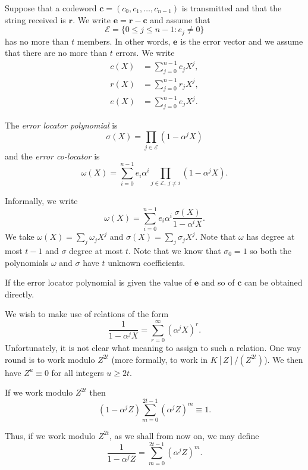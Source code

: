 Suppose that a codeword
${\mathbf c}=(c_{0},c_{1},\dots,c_{n-1})$ is
transmitted and that the string received is
${\mathbf r}$. We write
${\mathbf e}={\mathbf r}-{\mathbf c}$
and assume that
\[{\mathcal E}=\{0\leq j\leq n-1:e_{j}\neq 0\}\]
has no more than $t$ members.
In other words, ${\mathbf e}$ is the error vector
and we assume that there are no more than
$t$ errors.
We write
\begin{align*}
c(X)&=\sum_{j=0}^{n-1}c_{j}X^{j},\\
r(X)&=\sum_{j=0}^{n-1}r_{j}X^{j},\\
e(X)&=\sum_{j=0}^{n-1}e_{j}X^{j}.
\end{align*}


\begin{definition} The \emph{error locator polynomial} is
\[\sigma(X)=\prod_{j\in{\mathcal E}}(1-\alpha^{j}X)\]
and the \emph{error co-locator} is
\[\omega(X)=\sum_{i=0}^{n-1}e_{i}\alpha^{i}
\prod_{j\in{\mathcal E},\ j\neq i}(1-\alpha^{j}X).\]
\end{definition}
\noindent
Informally, we write
\[\omega(X)=\sum_{i=0}^{n-1}e_{i}\alpha^{i}
\frac{\sigma(X)}{1-\alpha^{i}X}.\]
We take $\omega(X)=\sum_{j}\omega_{j}X^{j}$ and
$\sigma(X)=\sum_{j}\sigma_{j}X^{j}$. Note that
$\omega$ has degree at most $t-1$ and $\sigma$
degree at most $t$. Note that we know that
$\sigma_{0}=1$ so both the polynomials
$\omega$ and $\sigma$ have $t$ unknown coefficients.
\begin{lemma} If the error locator polynomial
is given the value of ${\mathbf e}$ and so of ${\mathbf c}$
can be obtained directly.
\end{lemma}


We wish to make use of relations of the form
\[\frac{1}{1-\alpha^{j}X}=\sum_{r=0}^{\infty}(\alpha^{j}X)^{r}.\]
Unfortunately, it is not clear what meaning to assign
to such a relation. One way round is to work modulo $Z^{2t}$
(more formally, to work in $K[Z]/(Z^{2t})$). We then
have $Z^{u}\equiv 0$ for all integers $u\geq 2t$.
\begin{lemma} If we work modulo $Z^{2t}$ then
\[(1-\alpha^{j}Z)\sum_{m=0}^{2t-1}(\alpha^{j}Z)^{m}\equiv 1.\]
\end{lemma}
Thus, if we work modulo
$Z^{2t}$, as we shall from now on,
we may define
\[\frac{1}{1-\alpha^{j}Z}=\sum_{m=0}^{2t-1}(\alpha^{j}Z)^{m}.\]

